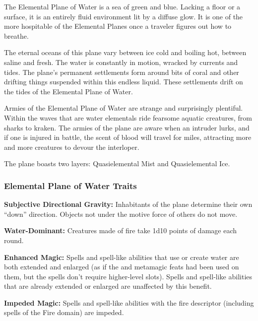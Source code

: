 The Elemental Plane of Water is a sea of green and blue. Lacking a floor or a surface, it is an entirely fluid environment lit by a diffuse glow. It is one of the more hospitable of the Elemental Planes once a traveler figures out how to breathe.

The eternal oceans of this plane vary between ice cold and boiling hot, between saline and fresh. The water is constantly in motion, wracked by currents and tides. The plane's permanent settlements form around bits of coral and other drifting things suspended within this endless liquid. These settlements drift on the tides of the Elemental Plane of Water.

Armies of the Elemental Plane of Water are strange and surprisingly plentiful. Within the waves that are water elementals ride fearsome aquatic creatures, from sharks to kraken. The armies of the plane are aware when an intruder lurks, and if one is injured in battle, the scent of blood will travel for miles, attracting more and more creatures to devour the interloper.

The plane boasts two layers: Quasielemental Mist and Quasielemental Ice.


\subsubsection{Elemental Plane of Water Traits}
\begin{itemize*}
\item \textbf{Subjective Directional Gravity:} Inhabitants of the plane determine their own ``down'' direction. Objects not under the motive force of others do not move.
\item \textbf{Water-Dominant:} Creatures made of fire take 1d10 points of damage each round.
\item \textbf{Enhanced Magic:} Spells and spell-like abilities that use or create water are both extended and enlarged (as if the  and  metamagic feats had been used on them, but the spells don't require higher-level slots). Spells and spell-like abilities that are already extended or enlarged are unaffected by this benefit.
\item \textbf{Impeded Magic:} Spells and spell-like abilities with the fire descriptor (including spells of the Fire domain) are impeded.
\end{itemize*}


